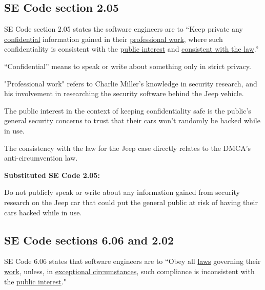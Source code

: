 \documentclass[12pt]{article}
\begin{document}
\begin{multicols}{2}




\subsection {SE Code section 2.05}

SE Code section 2.05 states the software engineers are to ``Keep private any \underline{confidential} information gained in their \underline{professional work}, where such confidentiality is consistent with the \underline{public interest} and \underline{consistent with the law}.''

``Confidential'' means to speak or write about something only in strict privacy.\cite{dictionary}

"Professional work" refers to Charlie Miller's knowledge in security research, and his involvement in researching the security software behind the Jeep vehicle. 

The public interest in the context of keeping confidentiality safe is the public's general security concerns to trust that their cars won't randomly be hacked while in use. 

The consistency with the law for the Jeep case directly relates to the DMCA's anti-circumvention law.

\vspace{.5cm}\textbf{Substituted SE Code 2.05:}\vspace{.25cm}

Do not publicly speak or write about any information gained from security research on the Jeep car that could put the general public at risk of having their cars hacked while in use.





\subsection{SE Code sections 6.06 and 2.02}
SE Code 6.06 states that software engineers are to ``Obey all \underline{laws} governing their \underline{work}, unless, in \underline{exceptional circumstances}, such compliance is inconsistent with the \underline{public interest}."\cite{seCode}


\end{multicols}
\end{document}
